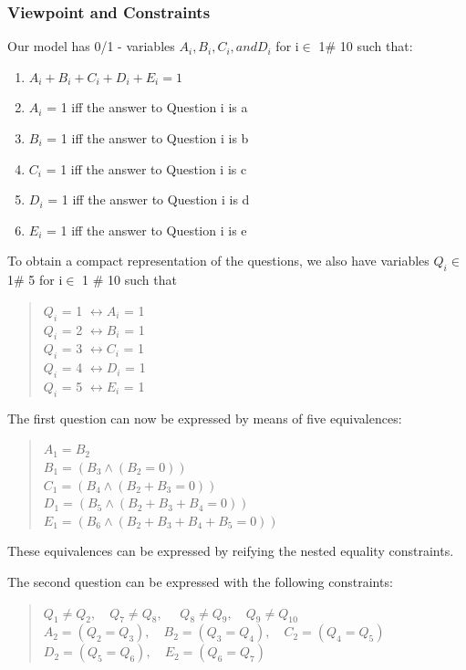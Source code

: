 \documentclass[a4paper,halfparskip]{scrartcl}
\begin{document}
\subsubsection{Viewpoint and Constraints}
Our model has 0/1 - variables $A_i, B_i, C_i, and D_i$ for i$\in$ 1$\#$ 10 
such that:
\begin{enumerate}
\item
$A_i + B_i + C_i + D_i + E_i = 1$
\item
$A_i$ = 1 iff the answer to Question i is a
\item
$B_i$ = 1 iff the answer to Question i is b
\item
$C_i$ = 1 iff the answer to Question i is c
\item
$D_i$ = 1 iff the answer to Question i is d
\item
$E_i$ = 1 iff the answer to Question i is e
\end{enumerate}
To obtain a compact representation of the questions, 
we also have variables $Q_i \in $ 1$\#$ 5 for i$\in$ 1 $\#$ 10 such that
\begin{quote}
$Q_i$ = 1 $\leftrightarrow A_i$ = 1\\
$Q_i$ = 2 $\leftrightarrow B_i$ = 1\\
$Q_i$ = 3 $\leftrightarrow C_i$ = 1\\
$Q_i$ = 4 $\leftrightarrow D_i$ = 1\\
$Q_i$ = 5 $\leftrightarrow E_i$ = 1
\end{quote}
The first question can now be expressed by means of five equivalences:
\begin{quote}
$ A_1 = B_2$ \\
$B_1 = (B_3\land (B_2=0))$ \\ 
$C_1 = (B_4\land (B_2+B_3=0))$\\ 
$D_1 = (B_5\land (B_2+B_3+B_4=0))$\\ 
$E_1 = (B_6\land (B_2+B_3+B_4+B_5=0))$
\end{quote}
These equivalences can be expressed by reifying the 
nested equality constraints.

The second question can be expressed with the following constraints:
\begin{quote}
$Q_1\neq Q_2,\quad Q_7\neq Q_8,$
$\quad Q_8\neq Q_9,\quad Q_9\neq Q_10$ \\ 
$A_2=(Q_2=Q_3),\quad B_2=(Q_3=Q_4),\quad C_2=(Q_4=Q_5)$ \\ 
$D_2=(Q_5=Q_6),\quad E_2=(Q_6=Q_7) $
\end{quote}
\end{document}
